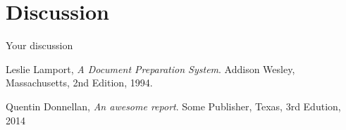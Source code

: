 \documentclass[12pt]{report}
\begin{document}
\chapter{Discussion}

Your discussion


\begin{thebibliography}{99}

  Leslie Lamport,
  \emph{A Document Preparation System}.
  Addison Wesley, Massachusetts,
  2nd Edition,
  1994.
  
  Quentin Donnellan,
  \emph{An awesome report}.
  Some Publisher, Texas,
  3rd Edution,
  2014

\end{thebibliography}
\end{document}
